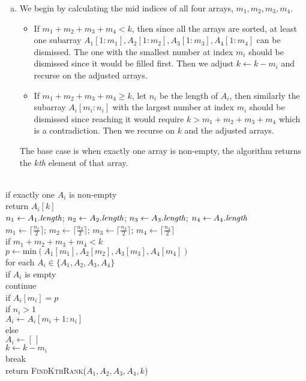 \documentclass[11pt]{article}
\begin{document}
\begin{solution}
\begin{enumerate}[(a)]
\item
We begin by calculating the mid indices of all four arrays, $m_1, m_2, m_3, m_4$.
\begin{itemize}
\item
If $m_1+m_2+m_3+m_4<k$, then since all the arrays are sorted, at least one subarray $A_1[1:m_1], A_2[1:m_2], A_3[1:m_3], A_4[1:m_4]$ can be dismissed. The one with the smallest number at index $m_i$ should be dismissed since it would be filled first. Then we adjust $k\gets k-m_i$ and recurse on the adjusted arrays.
\item
If $m_1+m_2+m_3+m_4\ge k$, let $n_i$ be the length of $A_i$, then similarly the subarray $A_i[m_i:n_i]$ with the largest number at index $m_i$ should be dismissed since reaching it would require $k> m_1+m_2+m_3+m_4$ which is a contradiction. Then we recurse on $k$ and the adjusted arrays.
\end{itemize}
The base case is when exactly one array is non-empty, the algorithm returns the $k$\emph{th} element of that array.
\end{enumerate}
\begin{algo}
	\+
\\	if exactly one $A_i$ is non-empty\+
\\	return $A_i[k]$\-
\\	$n_1\gets A_1.\emph{length}$; $n_2\gets A_2.\emph{length}$; $n_3\gets A_3.\emph{length}$; $n_4\gets A_4.\emph{length}$
\\	$m_1\gets \lceil \frac{n_1}{2} \rceil$; $m_2\gets \lceil \frac{n_2}{2} \rceil$; $m_3\gets \lceil \frac{n_3}{2} \rceil$; $m_4\gets \lceil \frac{n_4}{2} \rceil$
\\	if $m_1+m_2+m_3+m_4<k$\+
\\	$p\gets \text{min}(A_1[m_1], A_2[m_2], A_3[m_3], A_4[m_4])$
\\	for each $A_i\in \{A_1, A_2, A_3, A_4\}$\+
\\	if $A_i$ is empty\+
\\	continue\-
\\	if $A_i[m_i]=p$\+
\\	if $n_i > 1$\+
\\	$A_i\gets A_i[m_i+1:n_i]$\-
\\	else\+
\\	$A_i\gets [\,]$\-
\\	$k\gets k-m_i$
\\	break\-\-
\\	return \textsc{FindKthRank($A_1, A_2, A_3, A_4, k$)}\-

\end{algo}
\end{solution}
\end{document}
